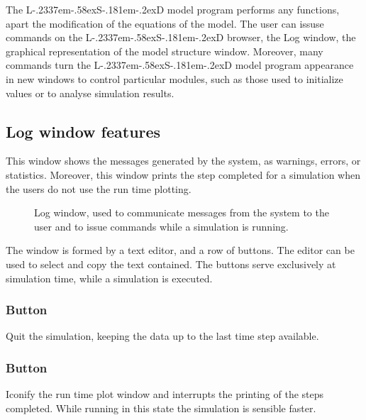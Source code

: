 \documentclass [11pt,a4paper] {book}
\def\LsD{{L\kern-.2337em\lower-.58ex\hbox{S}\kern-.181em\lower-.2ex\hbox{D}}\xspace}
\begin{document}
The \LsD model program performs any functions, apart the modification of the equations of the model. The user can issuse commands on the \LsD browser, the Log window, the graphical representation of the model structure window. Moreover, many commands turn the \LsD model program appearance in new windows to control particular modules, such as those used to initialize values or to analyse  simulation results. 


\subsection{Log window features}
This window shows the messages generated by the system, as warnings, errors, or statistics. Moreover, this window prints the step completed for a simulation when the users do not use the run time plotting.

\begin{figure}[ht]
  \centering
  \caption{\small Log window, used to communicate messages from the system to the user and to issue commands while a simulation is running.}
   \label{fig:log}
\end{figure}


The window is formed by a text editor, and a row of buttons. The editor can be used to select and copy the text contained. The buttons serve exclusively at simulation time, while a simulation is executed. 

\subsubsection{Button }

Quit the simulation, keeping the data up to the last time step available.

\subsubsection{Button }
Iconify the run time plot window and interrupts the printing of the steps completed. While running in this state the simulation is sensible faster.
\end{document}
